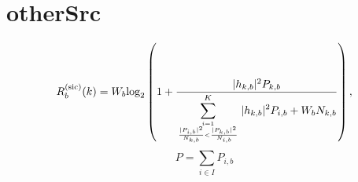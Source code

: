 \section{otherSrc}
\begin{equation}
\label{eq_sic_shannon}
R_b^{\text{(sic)}}(k)=W_b \text{log}_2 \left(1+\frac{|h_{k, b}|^2 P_{k, b}}{\displaystyle\sum^K_{{i=1} \atop {\frac{|P_{i, b}|^2}{N_{k, b}} < \frac{|P_{k, b}|^2}{N_{i, b}}}} |h_{k, b}|^2 P_{i, b} +W_b N_{k, b}} \right),
\end{equation}
\begin{equation}
\label{eq_sic_shannon}
P = \underset{i\in I}{\sum} P_{i,b}
\end{equation}